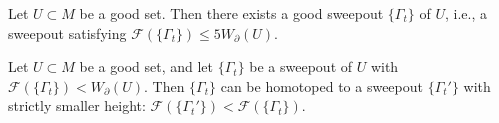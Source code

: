 \begin{theorem}\label{thm:existence-good-sweepouts}
Let $U \subset M$ be a good set. Then there exists a good sweepout $\{\Gamma_t\}$ of $U$, i.e., a sweepout satisfying $\mathcal{F}(\{\Gamma_t\}) \leq 5 W_\partial(U)$.
\end{theorem}

\begin{theorem}\label{thm:improvement-sweepouts}
Let $U \subset M$ be a good set, and let $\{\Gamma_t\}$ be a sweepout of $U$ with
$\mathcal{F}(\{\Gamma_t\}) < W_\partial(U)$. Then $\{\Gamma_t\}$ can be homotoped to a sweepout
$\{\Gamma_t'\}$ with strictly smaller height: $\mathcal{F}(\{\Gamma_t'\}) < \mathcal{F}(\{\Gamma_t\})$.
\end{theorem}